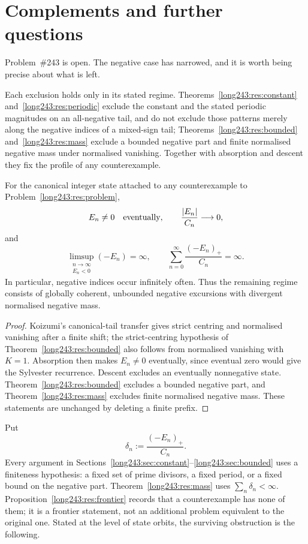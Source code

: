 \section{Complements and further questions}\label{long243:sec:open}

Problem~\#243 is open.  The negative case has narrowed, and it is worth being
precise about what is left.

Each exclusion holds only in its stated regime.  Theorems~\ref{long243:res:constant}
and~\ref{long243:res:periodic} exclude the constant and the stated periodic magnitudes
on an all-negative tail, and do not exclude those patterns merely along the
negative indices of a mixed-sign tail; Theorems~\ref{long243:res:bounded}
and~\ref{long243:res:mass} exclude a bounded negative part and finite normalised
negative mass under normalised vanishing.  Together with absorption and descent
they fix the profile of any counterexample.

\begin{proposition}\label{long243:res:frontier}
For the canonical integer state attached to any counterexample to
Problem~\ref{long243:res:problem},
\[
 E_n\ne0\quad\hbox{eventually},\qquad
 \frac{|E_n|}{C_n}\longrightarrow0,
\]
and
\[
 \limsup_{\substack{n\to\infty\\E_n<0}}(-E_n)=\infty,
 \qquad
 \sum_{n=0}^{\infty}\frac{(-E_n)_+}{C_n}=\infty .
\]
In particular, negative indices occur infinitely often.  Thus the remaining
regime consists of globally coherent, unbounded negative excursions with
divergent normalised negative mass.
\end{proposition}

\begin{proof}
Koizumi's canonical-tail transfer gives strict centring and normalised
vanishing after a finite shift; the strict-centring hypothesis of
Theorem~\ref{long243:res:bounded} also follows from normalised vanishing with $K=1$.
Absorption then makes $E_n\ne0$ eventually,
since eventual zero would give the Sylvester recurrence.  Descent excludes an
eventually nonnegative state.  Theorem~\ref{long243:res:bounded} excludes a bounded
negative part, and Theorem~\ref{long243:res:mass} excludes finite normalised negative
mass.  These statements are unchanged by deleting a finite prefix.
\end{proof}

Put
\[
 \delta_n:=\frac{(-E_n)_+}{C_n}.
\]
Every argument in Sections~\ref{long243:sec:constant}--\ref{long243:sec:bounded} uses a
finiteness hypothesis: a fixed set of prime divisors, a fixed period, or a
fixed bound on the negative part.  Theorem~\ref{long243:res:mass} uses
$\sum_n\delta_n<\infty$.  Proposition~\ref{long243:res:frontier} records that a
counterexample has none of them; it is a frontier statement, not an additional
problem equivalent to the original one.  Stated at the level of state orbits,
the surviving obstruction is the following.

